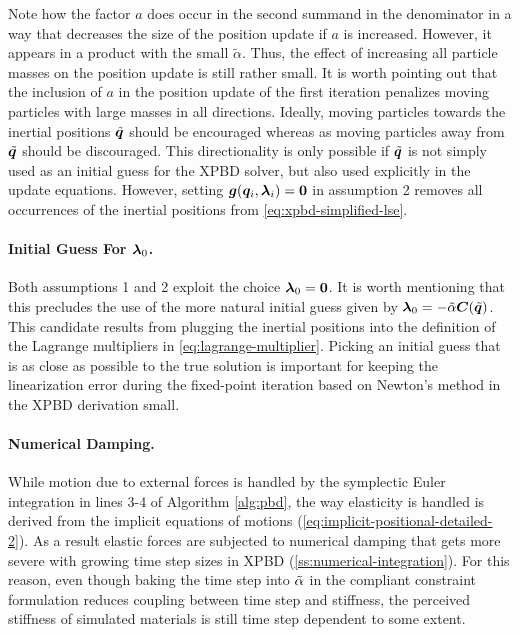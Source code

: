 \noindent Note how the factor $a$ does occur in the second summand in the denominator in a way that decreases the size of the position update
if $a$ is increased. However, it appears in a product with the small $\tilde{\alpha}$. Thus, the effect of increasing all particle masses on
the position update is still rather small. It is worth pointing out that the inclusion of $a$ in the position update of the first iteration
penalizes moving particles with large masses in all directions. Ideally, moving particles towards the inertial positions $\tilde{\bm{q}}$
should be encouraged whereas as moving particles away from $\tilde{\bm{q}}$ should be discouraged. This directionality is only possible if
$\tilde{\bm{q}}$ is not simply used as an initial guess for the XPBD solver, but also used explicitly in the update equations. However, setting
$\bm{g}(\bm{q}_i, \bm{\lambda}_i) = \bm{0}$ in assumption 2 removes all occurrences of the inertial positions from \autoref{eq:xpbd-simplified-lse}.

\paragraph{Initial Guess For $\bm{\lambda}_0$.}
Both assumptions 1 and 2 exploit the choice $\bm{\lambda}_0 = \bm{0}$. It is worth mentioning that this precludes the use of the more natural
initial guess given by $\bm{\lambda}_0 = -\tilde{\mathbf{\alpha}} \bm{C}(\tilde{\bm{q}})$. This candidate results from plugging the 
inertial positions into the
definition of the Lagrange multipliers in \autoref{eq:lagrange-multiplier}. Picking an initial guess that is as close as possible to the true
solution is important for keeping the linearization error during the fixed-point iteration based on Newton's method in the XPBD derivation 
small. 

\paragraph{Numerical Damping.}
While motion due to external forces is handled by the symplectic Euler integration in lines 3-4 of Algorithm \ref{alg:pbd}, the way 
elasticity is handled is derived from the implicit equations of motions (\cref{eq:implicit-positional-detailed-2}). As a result 
elastic forces are subjected to numerical damping that gets more severe with growing time step sizes in XPBD (\cref{ss:numerical-integration}). 
For this reason, even though baking the time step into $\tilde{\mathbf{\alpha}}$ in the compliant constraint formulation reduces coupling 
between time step and stiffness, the perceived stiffness of simulated materials is still time step dependent to some extent.

